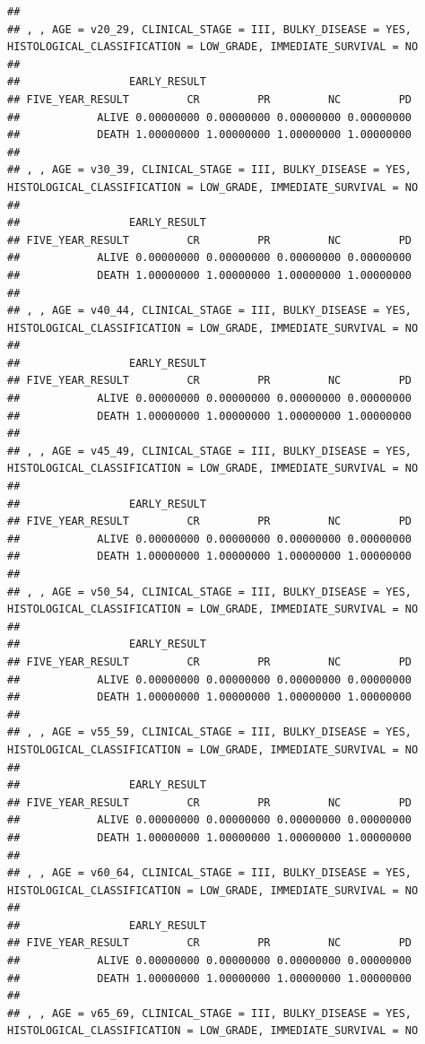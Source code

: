 \documentclass[]{article}
\begin{document}
\begin{verbatim}
## 
## , , AGE = v20_29, CLINICAL_STAGE = III, BULKY_DISEASE = YES, HISTOLOGICAL_CLASSIFICATION = LOW_GRADE, IMMEDIATE_SURVIVAL = NO
## 
##                 EARLY_RESULT
## FIVE_YEAR_RESULT         CR         PR         NC         PD
##            ALIVE 0.00000000 0.00000000 0.00000000 0.00000000
##            DEATH 1.00000000 1.00000000 1.00000000 1.00000000
## 
## , , AGE = v30_39, CLINICAL_STAGE = III, BULKY_DISEASE = YES, HISTOLOGICAL_CLASSIFICATION = LOW_GRADE, IMMEDIATE_SURVIVAL = NO
## 
##                 EARLY_RESULT
## FIVE_YEAR_RESULT         CR         PR         NC         PD
##            ALIVE 0.00000000 0.00000000 0.00000000 0.00000000
##            DEATH 1.00000000 1.00000000 1.00000000 1.00000000
## 
## , , AGE = v40_44, CLINICAL_STAGE = III, BULKY_DISEASE = YES, HISTOLOGICAL_CLASSIFICATION = LOW_GRADE, IMMEDIATE_SURVIVAL = NO
## 
##                 EARLY_RESULT
## FIVE_YEAR_RESULT         CR         PR         NC         PD
##            ALIVE 0.00000000 0.00000000 0.00000000 0.00000000
##            DEATH 1.00000000 1.00000000 1.00000000 1.00000000
## 
## , , AGE = v45_49, CLINICAL_STAGE = III, BULKY_DISEASE = YES, HISTOLOGICAL_CLASSIFICATION = LOW_GRADE, IMMEDIATE_SURVIVAL = NO
## 
##                 EARLY_RESULT
## FIVE_YEAR_RESULT         CR         PR         NC         PD
##            ALIVE 0.00000000 0.00000000 0.00000000 0.00000000
##            DEATH 1.00000000 1.00000000 1.00000000 1.00000000
## 
## , , AGE = v50_54, CLINICAL_STAGE = III, BULKY_DISEASE = YES, HISTOLOGICAL_CLASSIFICATION = LOW_GRADE, IMMEDIATE_SURVIVAL = NO
## 
##                 EARLY_RESULT
## FIVE_YEAR_RESULT         CR         PR         NC         PD
##            ALIVE 0.00000000 0.00000000 0.00000000 0.00000000
##            DEATH 1.00000000 1.00000000 1.00000000 1.00000000
## 
## , , AGE = v55_59, CLINICAL_STAGE = III, BULKY_DISEASE = YES, HISTOLOGICAL_CLASSIFICATION = LOW_GRADE, IMMEDIATE_SURVIVAL = NO
## 
##                 EARLY_RESULT
## FIVE_YEAR_RESULT         CR         PR         NC         PD
##            ALIVE 0.00000000 0.00000000 0.00000000 0.00000000
##            DEATH 1.00000000 1.00000000 1.00000000 1.00000000
## 
## , , AGE = v60_64, CLINICAL_STAGE = III, BULKY_DISEASE = YES, HISTOLOGICAL_CLASSIFICATION = LOW_GRADE, IMMEDIATE_SURVIVAL = NO
## 
##                 EARLY_RESULT
## FIVE_YEAR_RESULT         CR         PR         NC         PD
##            ALIVE 0.00000000 0.00000000 0.00000000 0.00000000
##            DEATH 1.00000000 1.00000000 1.00000000 1.00000000
## 
## , , AGE = v65_69, CLINICAL_STAGE = III, BULKY_DISEASE = YES, HISTOLOGICAL_CLASSIFICATION = LOW_GRADE, IMMEDIATE_SURVIVAL = NO

\end{verbatim}
\end{document}
